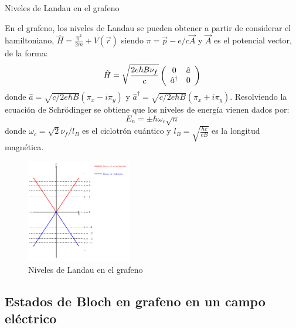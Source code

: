 \begin{frame}{Niveles de Landau en el grafeno}
	\begin{multicols}{2}
		\scriptsize{En el grafeno, los niveles de Landau se pueden obtener a partir de considerar el hamiltoniano, 
						$\hat{H}=\frac{\hat{\pi}^2}{2m}+V(\vec{r})$ siendo $\pi=\vec{p}-e/c\vec{A}$ y $\vec{A}$ es el potencial vector, de la forma:
			\begin{equation}
					\hat{H} = \sqrt{\frac{2e\hbar B \nu_f}{c}}
					\left( \begin{array}{c c}
							0&\hat{a}\\\hat{a}^\dagger&0
					\end{array} \right)
			\end{equation}
			donde $\hat{a}= \sqrt{c/2e\hbar B}(\pi_x-i\pi_y)$ y 	$\hat{a}^\dagger=\sqrt{c/2e\hbar B}(\pi_x+i\pi_y)$. Resolviendo la ecuación de Schrödinger
			se obtiene que los niveles de energía vienen dados por:
			\begin{equation}
					E_n= \pm \hbar\omega_c \sqrt{n}
			\end{equation}
			donde $\omega_c = \sqrt{2}\nu_f/l_B$ es el ciclotrón cuántico y $l_B = \sqrt{\frac{\hbar c}{e B}}$ es la longitud magnética.}
		\begin{figure}
			\includegraphics[height=4.5cm]{graficas/LL_grafeno.png}
			\caption{\scriptsize{Niveles de Landau en el grafeno}}
		\end{figure}
	
	\end{multicols}
	\end{frame}
\subsection{Estados de Bloch en grafeno en un campo eléctrico}

\begin{frame}
\end{frame}
\begin{frame}
\end{frame}
\begin{frame}
\end{frame}
\begin{frame}
\end{frame}

\begin{frame}
\end{frame}
\begin{frame}
\end{frame}
\begin{frame}
\end{frame}
